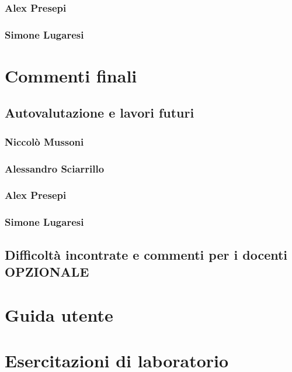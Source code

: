 \documentclass[a4paper,12pt]{report}
\begin{document}
\subsection*{Alex Presepi}
\subsection*{Simone Lugaresi}

\chapter{Commenti finali}
\section{Autovalutazione e lavori futuri}
\subsection*{Niccolò Mussoni}
\subsection*{Alessandro Sciarrillo}
\subsection*{Alex Presepi}
\subsection*{Simone Lugaresi}

\section{Difficoltà incontrate e commenti per i docenti OPZIONALE}

\appendix
\chapter{Guida utente}

\chapter{Esercitazioni di laboratorio}
\end{document}
